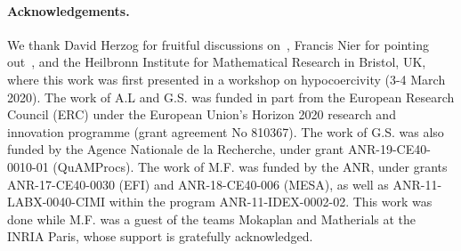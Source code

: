 \documentclass{article}
\begin{document}
\paragraph{Acknowledgements.}
We thank David Herzog for fruitful discussions on~\cite{AM19,CLW19}, Francis Nier for pointing out~\cite{SZ07}, and the Heilbronn Institute for Mathematical Research in Bristol, UK, where this work was first presented in a workshop on hypocoercivity (3-4 March 2020). The work of A.L and G.S. was funded in part from the European Research Council (ERC) under the European Union's Horizon 2020 research and innovation programme (grant agreement No 810367). The work of G.S. was also funded by the Agence Nationale de la Recherche, under grant ANR-19-CE40-0010-01 (QuAMProcs). The work of M.F. was funded by the ANR, under grants ANR-17-CE40-0030 (EFI) and ANR-18-CE40-006 (MESA), as well as ANR-11-LABX-0040-CIMI within the program ANR-11-IDEX-0002-02. This work was done while M.F. was a guest of the teams Mokaplan and Matherials at the INRIA Paris, whose support is gratefully acknowledged. 

%
%
\end{document}
